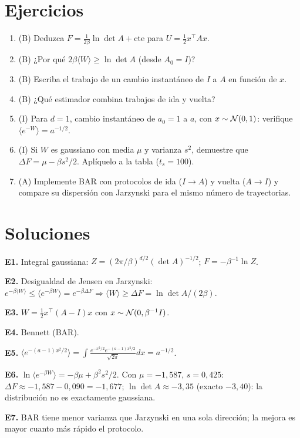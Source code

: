\documentclass[11pt,a4paper]{article}
\begin{document}
\section{Ejercicios}
\begin{enumerate}[label=\textbf{E\arabic*.}]
\item (B) Deduzca $F=\tfrac1{2\beta}\ln\det A+\text{cte}$ para $U=\tfrac12x^\top Ax$.
\item (B) ¿Por qué $2\beta\langle W\rangle\ge\ln\det A$ (desde $A_0=I$)?
\item (B) Escriba el trabajo de un cambio instantáneo de $I$ a $A$ en función de $x$.
\item (B) ¿Qué estimador combina trabajos de ida y vuelta?
\item (I) Para $d=1$, cambio instantáneo de $a_0=1$ a $a$, con $x\sim\mathcal{N}(0,1)$: verifique $\langle e^{-W}\rangle=a^{-1/2}$.
\item (I) Si $W$ es gaussiano con media $\mu$ y varianza $s^2$, demuestre que $\Delta F=\mu-\beta s^2/2$. Aplíquelo a la tabla ($t_s=100$).
\item (A) Implemente BAR con protocolos de ida ($I\to A$) y vuelta ($A\to I$) y compare su dispersión con Jarzynski para el mismo número de trayectorias.
\end{enumerate}
\section{Soluciones}
\begin{solucion}
\textbf{E1.} Integral gaussiana: $Z=(2\pi/\beta)^{d/2}(\det A)^{-1/2}$; $F=-\beta^{-1}\ln Z$.

\textbf{E2.} Desigualdad de Jensen en Jarzynski: $e^{-\beta\langle W\rangle}\le\langle e^{-\beta W}\rangle=e^{-\beta\Delta F}\Rightarrow\langle W\rangle\ge\Delta F=\ln\det A/(2\beta)$.

\textbf{E3.} $W=\tfrac12x^\top(A-I)x$ con $x\sim\mathcal{N}(0,\beta^{-1}I)$.

\textbf{E4.} Bennett (BAR).

\textbf{E5.} $\langle e^{-(a-1)x^2/2}\rangle=\int\frac{e^{-x^2/2}e^{-(a-1)x^2/2}}{\sqrt{2\pi}}dx=a^{-1/2}$.

\textbf{E6.} $\ln\langle e^{-\beta W}\rangle=-\beta\mu+\beta^2s^2/2$. Con $\mu=-1{,}587$, $s=0{,}425$: $\Delta F\approx-1{,}587-0{,}090=-1{,}677$; $\ln\det A\approx-3{,}35$ (exacto $-3{,}40$):
la distribución no es exactamente gaussiana.

\textbf{E7.} BAR tiene menor varianza que Jarzynski en una sola dirección; la mejora es mayor cuanto más rápido el protocolo.
\end{solucion}
\end{document}
